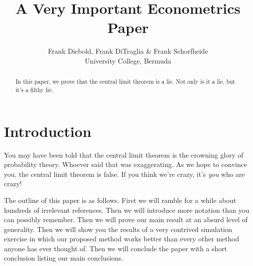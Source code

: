 \documentclass[12pt,letterpaper]{article}
\title{A Very Important Econometrics Paper}
\author{Frank Diebold, Frank DiTraglia & Frank Schorfheide \\ University College, Bermuda}
\begin{document}
\maketitle

\begin{abstract}
	In this paper, we prove that the central limit theorem is a lie. 
	Not only is it a lie, but it's a filthy lie.
\end{abstract}

\section{Introduction}
You may have been told that the central limit theorem is the crowning glory of probability theory.
Whoever said that was exaggerating.
As we hope to convince you, the central limit theorem is false.
If you think we're crazy, it's \emph{you} who are crazy!

The outline of this paper is as follows.
First we will ramble for a while about hundreds of irrelevant references.
Then we will introduce more notation than you can possibly remember.
Then we will prove our main result at an absurd level of generality.
Then we will show you the results of a very contrived simulation exercise in which our proposed method works better than every other method anyone has ever thought of.
Then we will conclude the paper with a short conclusion listing our main conclusions.
\end{document}
